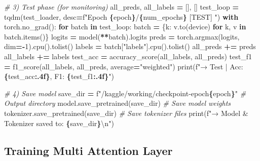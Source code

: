 \documentclass[
]{article}
\newenvironment{Shaded}{\begin{snugshade}}{\end{snugshade}}
\newcommand{\BuiltInTok}[1]{#1}
\newcommand{\CharTok}[1]{\textcolor[rgb]{0.31,0.60,0.02}{#1}}
\newcommand{\CommentTok}[1]{\textcolor[rgb]{0.56,0.35,0.01}{\textit{#1}}}
\newcommand{\ControlFlowTok}[1]{\textcolor[rgb]{0.13,0.29,0.53}{\textbf{#1}}}
\newcommand{\DecValTok}[1]{\textcolor[rgb]{0.00,0.00,0.81}{#1}}
\newcommand{\KeywordTok}[1]{\textcolor[rgb]{0.13,0.29,0.53}{\textbf{#1}}}
\newcommand{\NormalTok}[1]{#1}
\newcommand{\OperatorTok}[1]{\textcolor[rgb]{0.81,0.36,0.00}{\textbf{#1}}}
\newcommand{\SpecialCharTok}[1]{\textcolor[rgb]{0.81,0.36,0.00}{\textbf{#1}}}
\newcommand{\SpecialStringTok}[1]{\textcolor[rgb]{0.31,0.60,0.02}{#1}}
\newcommand{\StringTok}[1]{\textcolor[rgb]{0.31,0.60,0.02}{#1}}
\begin{document}
\begin{Shaded}
\begin{Highlighting}[]
    \CommentTok{\# 3) Test phase (for monitoring)}
\NormalTok{    all\_preds, all\_labels }\OperatorTok{=}\NormalTok{ [], []}
\NormalTok{    test\_loop }\OperatorTok{=}\NormalTok{ tqdm(test\_loader, desc}\OperatorTok{=}\SpecialStringTok{f"Epoch }\SpecialCharTok{\{}\NormalTok{epoch}\SpecialCharTok{\}}\SpecialStringTok{/}\SpecialCharTok{\{}\NormalTok{num\_epochs}\SpecialCharTok{\}}\SpecialStringTok{ [TEST] "}\NormalTok{)}
    \ControlFlowTok{with}\NormalTok{ torch.no\_grad():}
        \ControlFlowTok{for}\NormalTok{ batch }\KeywordTok{in}\NormalTok{ test\_loop:}
\NormalTok{            batch }\OperatorTok{=}\NormalTok{ \{k: v.to(device) }\ControlFlowTok{for}\NormalTok{ k, v }\KeywordTok{in}\NormalTok{ batch.items()\}}
\NormalTok{            logits }\OperatorTok{=}\NormalTok{ model(}\OperatorTok{**}\NormalTok{batch).logits}
\NormalTok{            preds  }\OperatorTok{=}\NormalTok{ torch.argmax(logits, dim}\OperatorTok{={-}}\DecValTok{1}\NormalTok{).cpu().tolist()}
\NormalTok{            labels }\OperatorTok{=}\NormalTok{ batch[}\StringTok{"labels"}\NormalTok{].cpu().tolist()}
\NormalTok{            all\_preds }\OperatorTok{+=}\NormalTok{ preds}
\NormalTok{            all\_labels }\OperatorTok{+=}\NormalTok{ labels}
\NormalTok{    test\_acc }\OperatorTok{=}\NormalTok{ accuracy\_score(all\_labels, all\_preds)}
\NormalTok{    test\_f1  }\OperatorTok{=}\NormalTok{ f1\_score(all\_labels, all\_preds, average}\OperatorTok{=}\StringTok{"weighted"}\NormalTok{)}
    \BuiltInTok{print}\NormalTok{(}\SpecialStringTok{f"→ Test       | Acc: }\SpecialCharTok{\{}\NormalTok{test\_acc}\SpecialCharTok{:.4f\}}\SpecialStringTok{, F1: }\SpecialCharTok{\{}\NormalTok{test\_f1}\SpecialCharTok{:.4f\}}\SpecialStringTok{"}\NormalTok{)}

    \CommentTok{\# 4) Save model}
\NormalTok{    save\_dir }\OperatorTok{=} \SpecialStringTok{f"/kaggle/working/checkpoint{-}epoch}\SpecialCharTok{\{}\NormalTok{epoch}\SpecialCharTok{\}}\SpecialStringTok{"}  \CommentTok{\# Output directory}
\NormalTok{    model.save\_pretrained(save\_dir)       }\CommentTok{\# Save model weights}
\NormalTok{    tokenizer.save\_pretrained(save\_dir)   }\CommentTok{\# Save tokenizer files}
    \BuiltInTok{print}\NormalTok{(}\SpecialStringTok{f"→ Model \& Tokenizer saved to: }\SpecialCharTok{\{}\NormalTok{save\_dir}\SpecialCharTok{\}}\CharTok{\textbackslash{}n}\SpecialStringTok{"}\NormalTok{)}
\end{Highlighting}
\end{Shaded}

\subsection{Training Multi Attention
Layer}\label{training-multi-attention-layer}
\end{document}
